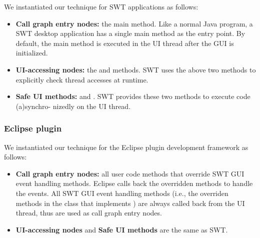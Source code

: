  We instantiated our technique for SWT applications as follows:

\begin{itemize}
\smallstep

\item \textbf{Call graph entry nodes: } the main method. Like a normal Java program,
a SWT desktop application has a single main method as the entry point. By default,
the main method is executed in the UI thread after the GUI
is initialized.

\smallstep

\item \textbf{UI-accessing nodes: } the 
and   methods. SWT uses the above
two methods to explicitly check thread accesses at runtime.
\smallstep

\item \textbf{Safe UI methods: } 
and . SWT provides these two methods
to execute code (a)synchro- nizedly on the UI thread.

\end{itemize}

\subsubsection{Eclipse plugin}

We instantiated our technique for the Eclipse plugin development framework as follows:

\smallstep


\begin{itemize}

\item \textbf{Call graph entry nodes: } all user code methods that override
 SWT GUI event handling methods. Eclipse
calls back the overridden methods to handle the
events. All SWT GUI event handling methods (i.e., the overriden
methods in the class that implements ) are
always called back from the UI thread, thus are used as call graph entry nodes.

\smallstep

\item \textbf{UI-accessing nodes} and \textbf{Safe UI methods} are the same as SWT.

\end{itemize}

